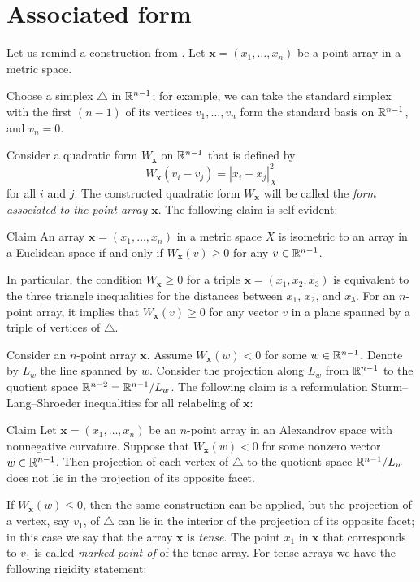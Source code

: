 \documentclass{article}
\begin{document}
\section{Associated form}

Let us remind a construction from \cite{petrunin-2017}.
Let $\bm{x}=(x_1,\dots,x_n)$ be a point array in a metric space.

Choose a simplex $\triangle$ in $\mathbb{R}^{n-1}$; for example, we can take the standard simplex with the first $(n-1)$ of its vertices $v_1,\dots,v_n$ form the standard basis on $\mathbb{R}^{n-1}$,
 and $v_n=0$.

Consider a quadratic form $W_{\bm{x}}$ on $\mathbb{R}^{n-1}$ that is defined by
\[W_{\bm{x}}(v_i-v_j)=|x_i-x_j|^2_X\] 
for all $i$ and $j$.
The constructed quadratic form $W_{\bm{x}}$ will be called
the \emph{form associated to the point array $\bm{x}$}.
The following claim is self-evident:

\begin{thm}{Claim}\label{clm:W>=0}
An array $\bm{x}=(x_1,\dots,x_n)$ in a metric space $X$ is isometric to an array in a Euclidean space if and only if 
$W_{\bm{x}}(v)\ge 0$
for any $v\in \mathbb{R}^{n-1}$.
\end{thm}


In particular, the condition $W_{\bm{x}}\ge 0$ for a triple $\bm{x}=(x_1,x_2,x_3)$ is equivalent to 
the three triangle inequalities for the distances between $x_1$, $x_2$, and $x_3$.
For an $n$-point array, it implies that $W_{\bm{x}}(v)\ge 0$ for any vector $v$ in a plane spanned by a triple of vertices of $\triangle$.

Consider an $n$-point array $\bm{x}$.
Assume $W_{\bm{x}}(w)<0$ for some $w\in\mathbb{R}^{n-1}$.
Denote by $L_w$ the line spanned by $w$.
Consider the projection along $L_w$ from $\mathbb{R}^{n-1}$ to the quotient space $\RR^{n-2}\z=\RR^{n-1}/L_w$.
The following claim is a reformulation Sturm--Lang--Shroeder inequalities for all relabeling of $\bm{x}$:

\begin{thm}{Claim}\label{clm:W(w)<0}
Let $\bm{x}=(x_1,\dots,x_n)$ be an $n$-point array in an Alexandrov space with nonnegative curvature.
Suppose that $W_{\bm{x}}(w)<0$ for some nonzero vector $w\in\mathbb{R}^{n-1}$.
Then projection of each vertex of $\triangle$ to the quotient space $\mathbb{R}^{n-1}/L_w$ does not lie in the projection of its opposite facet.
\end{thm}

If $W_{\bm{x}}(w)\le0$, then the same construction can be applied, but the projection of a vertex, say $v_1$, of $\triangle$ can lie in the interior of the projection of its opposite facet;
in this case we say that the array $\bm{x}$ is \emph{tense}.
The point $x_1$ in $\bm{x}$ that corresponds to $v_1$ is called \emph{marked point of} of the tense array.
For tense arrays we have the following rigidity statement:
\end{document}
